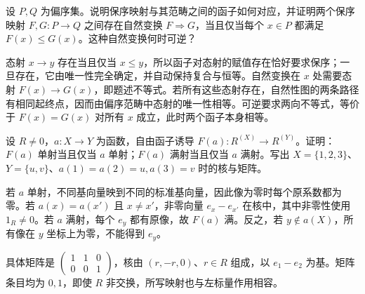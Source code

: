 \begin{exercise}\label{b2:ex:05-posets-opposite}
	设 \(P,Q\) 为偏序集。说明保序映射与其范畴之间的函子如何对应，并证明两个保序映射 \(F,G:P\rightarrow Q\) 之间存在自然变换 \(F\Rightarrow G\)，当且仅当每个 \(x\in P\) 都满足 \(F(x)\le G(x)\)。这种自然变换何时可逆？
\end{exercise}
\begin{solution}
	态射 \(x\rightarrow y\) 存在当且仅当 \(x\le y\)，所以函子对态射的赋值存在恰好要求保序；一旦存在，它由唯一性完全确定，并自动保持复合与恒等。自然变换在 \(x\) 处需要态射 \(F(x)\rightarrow G(x)\)，即题述不等式。若所有这些态射存在，自然性图的两条路径有相同起终点，因而由偏序范畴中态射的唯一性相等。可逆要求两向不等式，等价于 \(F(x)=G(x)\) 对所有 \(x\) 成立，此时两个函子本身相等。
\end{solution}

\begin{exercise}\label{b2:ex:05-free-functor-map}
	设 \(R\ne0\)，\(a:X\rightarrow Y\) 为函数，自由函子诱导 \(F(a):R^{(X)}\rightarrow R^{(Y)}\)。证明：\(F(a)\) 单射当且仅当 \(a\) 单射；\(F(a)\) 满射当且仅当 \(a\) 满射。写出 \(X=\{1,2,3\}\)、\(Y=\{u,v\}\)、\(a(1)=a(2)=u,a(3)=v\) 时的核与矩阵。
\end{exercise}
\begin{solution}
	若 \(a\) 单射，不同基向量映到不同的标准基向量，因此像为零时每个原系数都为零。若 \(a(x)=a(x')\) 且 \(x\ne x'\)，非零向量 \(e_x-e_{x'}\) 在核中，其中非零性使用 \(1_R\ne0\)。若 \(a\) 满射，每个 \(e_y\) 都有原像，故 \(F(a)\) 满。反之，若 \(y\notin a(X)\)，所有像在 \(y\) 坐标上为零，不能得到 \(e_y\)。

	具体矩阵是 \(\begin{pmatrix}1&1&0\\0&0&1\end{pmatrix}\)，核由 \((r,-r,0)\)、\(r\in R\) 组成，以 \(e_1-e_2\) 为基。矩阵条目均为 \(0,1\)，即使 \(R\) 非交换，所写映射也与左标量作用相容。
\end{solution}

